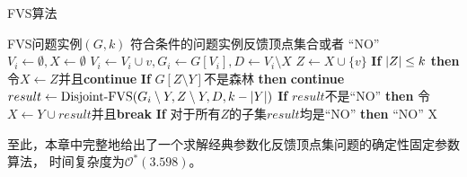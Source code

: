 \begin{algorithm}
\caption{FVS算法}
\begin{algorithmic}[1]
\Require FVS问题实例$(G,k)$
\Ensure  符合条件的问题实例反馈顶点集合或者 “NO”
\algrule
{}
    \State $V_i \gets \emptyset, X \gets \emptyset$
        \State $V_i \gets V_i \cup v, G_i \gets G[V_i], D \gets V_i \setminus X$
        \State $Z \gets X \cup \{v\}$
        \State \textbf{If} $\left\vert Z \right\vert \le k$ \textbf{then} 令$X \gets Z$并且\textbf{continue}
            \State \textbf{If} $G[Z \setminus Y]$不是森林 \textbf{then} \textbf{continue}
            \State $result \gets \text{Disjoint-FVS}(G_i \setminus Y, Z \setminus Y, D, k - \left\vert Y \right\vert)$
            \State \textbf{If} $result$不是“NO” \textbf{then} 令$X \gets Y \cup result$并且\textbf{break}
        \EndFor
        \State \textbf{If} 对于所有$Z$的子集$result$均是“NO” \textbf{then} \Return “NO”
    \EndFor
    \State \Return X
\EndFunction
\end{algorithmic}
\end{algorithm}

至此，本章中完整地给出了一个求解经典参数化反馈顶点集问题的确定性固定参数算法，
时间复杂度为$\mathcal{O}^*(3.598)$。
